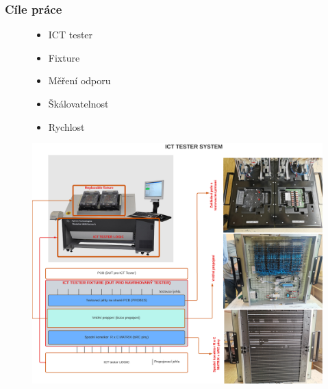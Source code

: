 \documentclass[%
  12pt,       				%
	t,                  %
	aspectratio=1610,   %
	unicode,						%
]{beamer}				    	%
\begin{document}
\disablenavigationsymbols

\maketitle


\begin{frame} 
	\frametitle{Cíle práce}
	\begin{figure}[ht!]
		\centering
		\begin{minipage}{0.3\textwidth}
			\vspace*{-3cm}
			\begin{itemize}
				\item ICT tester
				\item Fixture
				\item Měření odporu
				\item Škálovatelnost
				\item Rychlost
			\end{itemize}
		\end{minipage}
		\begin{minipage}{0.65\textwidth}
		\includegraphics[height = 0.8\textheight]{obrazky/ICT_tester.png}
		\end{minipage}
	\end{figure}
\end{frame}
\end{document}
